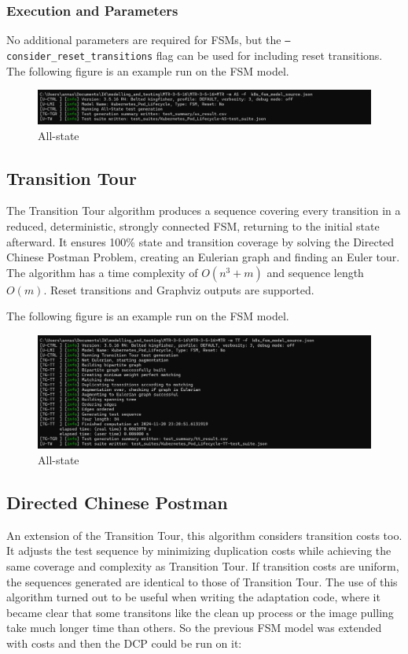 \documentclass[main.tex]{subfiles}
\begin{document}
\subsubsection*{Execution and Parameters}
No additional parameters are required for FSMs, but the \texttt{--consider\_reset\_transitions} flag can be used for including reset transitions.
The following figure is an example run on the FSM model.
\begin{figure}[H]
    \centering
    \includegraphics[width=\textwidth]{test_results/AS.png}
    \caption{All-state}
    \label{fig:all_state}
\end{figure}


\subsection{Transition Tour}
The Transition Tour algorithm produces a sequence covering every transition in a reduced, deterministic, strongly connected FSM, returning to the initial state afterward. It ensures 100\% state and transition coverage by solving the Directed Chinese Postman Problem, creating an Eulerian graph and finding an Euler tour. The algorithm has a time complexity of $O(n^3 + m)$ and sequence length $O(m)$. Reset transitions and Graphviz outputs are supported.

The following figure is an example run on the FSM model.
\begin{figure}[H]
    \centering
    \includegraphics[width=\textwidth]{test_results/TT.png}
    \caption{All-state}
    \label{fig:all_state}
\end{figure}

\subsection{Directed Chinese Postman}
An extension of the Transition Tour, this algorithm considers transition costs too. It adjusts the test sequence by minimizing duplication costs while achieving the same coverage and complexity as Transition Tour. If transition costs are uniform, the sequences generated are identical to those of Transition Tour.
The use of this algorithm turned out to be useful when writing the adaptation code, where it became clear that some transitons like the clean up process or the image pulling take much longer time than others. So the previous FSM model was extended with costs and then the DCP could be run on it:
\end{document}
